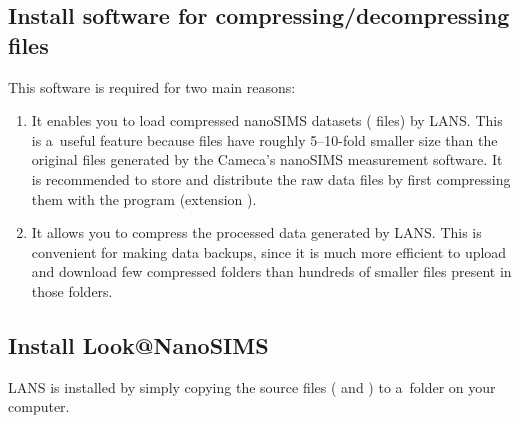 
\subsection{Install software for compressing/decompressing files}
\setcounter{step}{0}

\goldbox{}
This software is required for two main reasons:

\begin{enumerate}
 
\item It enables you to load compressed nanoSIMS datasets ( files) by LANS. This is a~useful feature because  files have roughly 5--10-fold smaller size than the original  files generated by the Cameca's nanoSIMS measurement software. It is recommended to store and distribute the raw data files by first compressing them with the  program (extension ). 

\item It allows you to compress the processed data generated by LANS. This is convenient for making data backups, since it is much more efficient to upload and download few compressed folders than hundreds of smaller files present in those folders.

\end{enumerate}
\tcbe



\subsection{Install Look@NanoSIMS}
\setcounter{step}{0}

\goldbox{}
LANS is installed by simply copying the source files ( and ) to a~folder on your computer.
\tcbe



